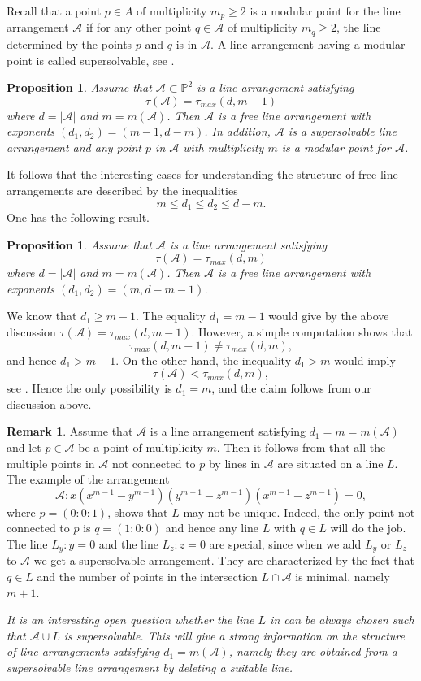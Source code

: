 \documentclass[12pt]{amsart}
\theoremstyle{plain}
\newtheorem{prop}[subsection]{Proposition}
\theoremstyle{definition}
\newtheorem{rk}[subsection]{Remark}
\numberwithin{equation}{section}
\newcommand{\A}{{\mathcal A}}
\begin{document}
Recall that a point $p \in A$ of multiplicity $m_p \geq 2$  is a modular point for the line arrangement $\A$ if for any other point 
$q \in \A$ of multiplicity $m_q \geq 2$, the line determined by the points $p$ and $q$ is in $\A$. A line arrangement having a modular point is called  supersolvable, see \cite{OT}.
 \begin{prop}
\label{prop00}
Assume that $\A \subset \mathbb{P}^{2}$ is a line arrangement satisfying
$$\tau(\A)=\tau_{max}(d,m-1)$$
where $d=|\A|$ and $m=m(\A)$. Then $\A$ is a free line arrangement with exponents
$(d_1,d_2)=(m-1,d-m)$. In addition, $\A$ is a supersolvable line arrangement and any point $p$ in $\A$ with multiplicity $m$ is a modular point for $\A$.
\end{prop}


It follows that the interesting cases for understanding the structure of free line arrangements are described by the inequalities
$$m \leq d_1 \leq d_2 \leq d-m.$$
One has the following result.
 \begin{prop}
\label{prop01}
Assume that $\A$ is a line arrangement satisfying
$$\tau(\A)=\tau_{max}(d,m)$$
where $d=|\A|$ and $m=m(\A)$. Then $\A$ is a free line arrangement with exponents
$(d_1,d_2)=(m,d-m-1)$.
\end{prop}
\proof
We know that $d_1 \geq m-1$. The equality $d_1=m-1$ would give by the above discussion
$\tau(\A)=\tau_{max}(d,m-1).$ However, a simple computation shows that
$$\tau_{max}(d,m-1) \ne \tau_{max}(d,m),$$
and hence $d_1>m-1$.
On the other hand, the inequality $d_1 >m$ would imply
$$\tau(\A) <\tau_{max}(d,m),$$
see \cite{dPCTC}. Hence the only possibility is $d_1=m$, and the claim follows from our discussion above.
\endproof
 \begin{rk}
\label{rk01}
Assume that $\A$ is a line arrangement satisfying $d_1=m=m(\A)$ and let $p \in \A$ be a point of multiplicity $m$.
Then it follows from  \cite[Theorem 1.12  (2)]{Der} that all the multiple points in $\A$ not connected to $p$ by lines in $\A$ are situated on a line $L$. The example of the arrangement
$$\A: x(x^{m-1}-y^{m-1})(y^{m-1}-z^{m-1})(x^{m-1}-z^{m-1})=0,$$
where $p=(0:0:1)$, shows that $L$ may not be unique. Indeed, the only point not connected to $p$ is $q=(1:0:0)$ and hence any line $L$ with $q \in L$ will do the job. The line $L_y: y=0$ and the line $L_z: z=0$ are special, since when we add $L_y$ or $L_z$ to $\A$ we get a supersolvable arrangement. They are characterized by the fact that $q \in L$ and the number of points in the intersection $L \cap \A$ is minimal, namely $m+1$. 

{\it It is an interesting open question whether the line $L$ in 
 \cite[Theorem 1.12  (2)]{Der} can be always chosen such that $\A \cup L$ is supersolvable. This will give a strong information on the structure of line arrangements satisfying $d_1=m(\A)$, namely they are obtained from a supersolvable line arrangement by deleting a suitable line.}
\end{rk}
\end{document}
